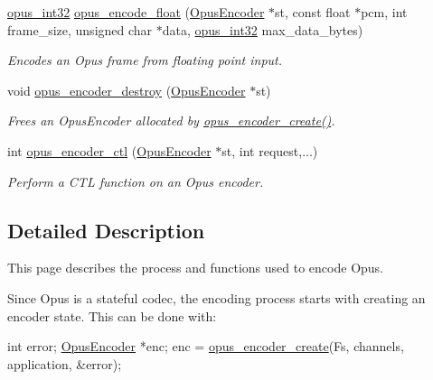 \begin{DoxyCompactItemize}
\hyperlink{opus__types_8h_aa4d309d6f80b99dbabebc8f98879ab9a}{opus\+\_\+int32} \hyperlink{group__opus__encoder_ga4ae9905859cd241ef4bb5c59cd5e5309}{opus\+\_\+encode\+\_\+float} (\hyperlink{group__opus__encoder_gaf461a3ef2f10c2fe8b994a176f06c9bd}{Opus\+Encoder} $\ast$st, const float $\ast$pcm, int frame\+\_\+size, unsigned char $\ast$data, \hyperlink{opus__types_8h_aa4d309d6f80b99dbabebc8f98879ab9a}{opus\+\_\+int32} max\+\_\+data\+\_\+bytes)
\begin{DoxyCompactList}\small\item\em Encodes an Opus frame from floating point input. \end{DoxyCompactList}\item 
void \hyperlink{group__opus__encoder_ga5f4c05b4b51cdffec5a55dbf17bbfa1c}{opus\+\_\+encoder\+\_\+destroy} (\hyperlink{group__opus__encoder_gaf461a3ef2f10c2fe8b994a176f06c9bd}{Opus\+Encoder} $\ast$st)
\begin{DoxyCompactList}\small\item\em Frees an {\ttfamily Opus\+Encoder} allocated by \hyperlink{group__opus__encoder_gaa89264fd93c9da70362a0c9b96b9ca88}{opus\+\_\+encoder\+\_\+create()}. \end{DoxyCompactList}\item 
int \hyperlink{group__opus__encoder_ga164cbb0425238961919adf1db67949df}{opus\+\_\+encoder\+\_\+ctl} (\hyperlink{group__opus__encoder_gaf461a3ef2f10c2fe8b994a176f06c9bd}{Opus\+Encoder} $\ast$st, int request,...)
\begin{DoxyCompactList}\small\item\em Perform a C\+TL function on an Opus encoder. \end{DoxyCompactList}\end{DoxyCompactItemize}


\subsection{Detailed Description}
This page describes the process and functions used to encode Opus. 

Since Opus is a stateful codec, the encoding process starts with creating an encoder state. This can be done with\+:


\begin{DoxyCode}
\textcolor{keywordtype}{int}          error;
\hyperlink{group__opus__encoder_gaf461a3ef2f10c2fe8b994a176f06c9bd}{OpusEncoder} *enc;
enc = \hyperlink{group__opus__encoder_gaa89264fd93c9da70362a0c9b96b9ca88}{opus\_encoder\_create}(Fs, channels, application, &error);
\end{DoxyCode}


